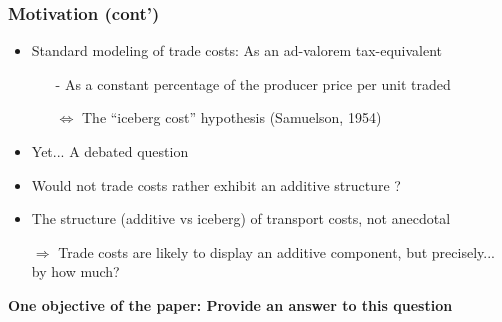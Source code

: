 \documentclass[10 pt,Helvetica, french]{beamer}
\begin{document}
\begin{frame}
\frametitle{Motivation (cont')}
\begin{itemize}
\item Standard modeling of trade costs: As an ad-valorem tax-equivalent \vspace{0.1cm}
\begin{itemize}
\item[-] As a constant percentage of the producer price per unit traded \vspace{0.1cm}
\item[$\Leftrightarrow$] The ``iceberg cost'' hypothesis (Samuelson, 1954) \vspace{0.1cm}
\end{itemize}
\item Yet... A debated question \vspace{0.1cm}
\item Would not trade costs rather exhibit an additive structure ?  \vspace{0.1cm}
\item The structure (additive vs iceberg) of transport costs, not anecdotal \vspace{0.1cm}
\item[$\Rightarrow$] Trade costs are likely to display an additive component, but precisely... by how much? \vspace{0.1cm}
\end{itemize}
\textbf{One objective of the paper: Provide an answer to this question}
\end{frame}
\end{document}
